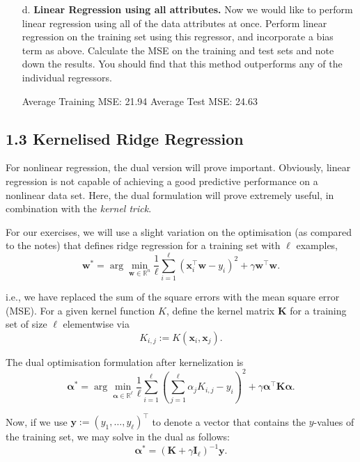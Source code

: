 \documentclass{article}
\begin{document}
\begin{enumerate}
    \item[d.] \textbf{Linear Regression using all attributes.} Now we would like to perform linear regression using all of the data attributes at once. Perform linear regression on the training set using this regressor, and incorporate a bias term as above. Calculate the MSE on the training and test sets and note down the results. You should find that this method outperforms any of the individual regressors.

    \begin{enumerate}
        Average Training MSE: 21.94
        Average Test MSE: 24.63
    \end{enumerate}
\end{enumerate}

\subsection*{1.3 Kernelised Ridge Regression}

For nonlinear regression, the dual version will prove important. Obviously, linear regression is not capable of achieving a good predictive performance on a nonlinear data set. Here, the dual formulation will prove extremely useful, in combination with the \emph{kernel trick}.

For our exercises, we will use a slight variation on the optimisation (as compared to the notes) that defines ridge regression for a training set with \(\ell\) examples,
\[
\mathbf{w}^* = \arg\min_{\mathbf{w} \in \mathbb{R}^n} \frac{1}{\ell} \sum_{i=1}^\ell \left( \mathbf{x}_i^\top \mathbf{w} - y_i \right)^2 + \gamma \mathbf{w}^\top \mathbf{w}. \tag{10}
\]

i.e., we have replaced the sum of the square errors with the mean square error (MSE). For a given kernel function \(K\), define the kernel matrix \(\mathbf{K}\) for a training set of size \(\ell\) elementwise via
\[
K_{i,j} := K(\mathbf{x}_i, \mathbf{x}_j).
\]

The dual optimisation formulation after kernelization is
\[
\boldsymbol{\alpha}^* = \arg\min_{\boldsymbol{\alpha} \in \mathbb{R}^\ell} \frac{1}{\ell} \sum_{i=1}^\ell \left( \sum_{j=1}^\ell \alpha_j K_{i,j} - y_i \right)^2 + \gamma \boldsymbol{\alpha}^\top \mathbf{K} \boldsymbol{\alpha}. \tag{11}
\]

Now, if we use \(\mathbf{y} := (y_1, \ldots, y_\ell)^\top\) to denote a vector that contains the \(y\)-values of the training set, we may solve in the dual as follows:
\[
\boldsymbol{\alpha}^* = \left( \mathbf{K} + \gamma \mathbf{I}_\ell \right)^{-1} \mathbf{y}. \tag{12}
\]
\end{document}
